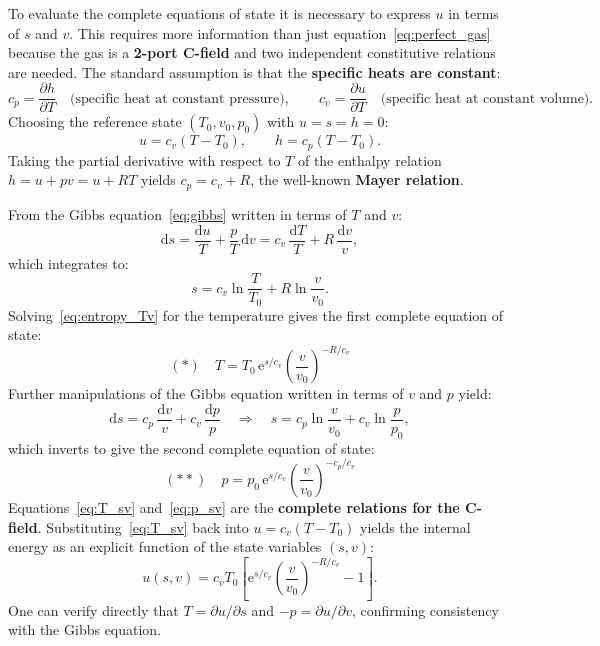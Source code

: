 To evaluate the complete equations of state it is necessary to express $u$
in terms of $s$ and $v$.  This requires more information than just
equation~\eqref{eq:perfect_gas} because the gas is a \textbf{2-port C-field}
and two independent constitutive relations are needed.  The standard
assumption is that the \textbf{specific heats are constant}:
\begin{equation}
  c_{p} = \frac{\partial h}{\partial T}
  \quad\text{(specific heat at constant pressure)},
  \qquad
  c_{v} = \frac{\partial u}{\partial T}
  \quad\text{(specific heat at constant volume)}.
  \label{eq:specific_heats}
\end{equation}
Choosing the reference state $(T_{0}, v_{0}, p_{0})$ with $u = s = h = 0$:
\begin{equation}
  u = c_{v}(T - T_{0}), \qquad h = c_{p}(T - T_{0}).
  \label{eq:u_h_linear}
\end{equation}
Taking the partial derivative with respect to $T$ of the enthalpy relation
$h = u + pv = u + RT$ yields $c_{p} = c_{v} + R$, the well-known
\textbf{Mayer relation}.

From the Gibbs equation~\eqref{eq:gibbs} written in terms of $T$ and $v$:
\begin{equation}
  \mathrm{d}s = \frac{\mathrm{d}u}{T} + \frac{p}{T}\,\mathrm{d}v
  = c_{v}\,\frac{\mathrm{d}T}{T} + R\,\frac{\mathrm{d}v}{v},
\end{equation}
which integrates to:
\begin{equation}
  s = c_{v}\ln\frac{T}{T_{0}} + R\ln\frac{v}{v_{0}}.
  \label{eq:entropy_Tv}
\end{equation}
Solving~\eqref{eq:entropy_Tv} for the temperature gives the first complete
equation of state:
\begin{equation}
  \boxed{
    (\ast)\quad
    T = T_{0}\,\mathrm{e}^{s/c_{v}}\!\left(\frac{v}{v_{0}}\right)^{-R/c_{v}}
  }
  \label{eq:T_sv}
\end{equation}
Further manipulations of the Gibbs equation written in terms of $v$ and $p$
yield:
\begin{equation}
  \mathrm{d}s = c_{p}\,\frac{\mathrm{d}v}{v} + c_{v}\,\frac{\mathrm{d}p}{p}
  \quad\Longrightarrow\quad
  s = c_{p}\ln\frac{v}{v_{0}} + c_{v}\ln\frac{p}{p_{0}},
\end{equation}
which inverts to give the second complete equation of state:
\begin{equation}
  \boxed{
    (\ast\ast)\quad
    p = p_{0}\,\mathrm{e}^{s/c_{v}}\!\left(\frac{v}{v_{0}}\right)^{-c_{p}/c_{v}}
  }
  \label{eq:p_sv}
\end{equation}
Equations~\eqref{eq:T_sv} and~\eqref{eq:p_sv} are the \textbf{complete
relations for the C-field}.  Substituting~\eqref{eq:T_sv} back into
$u = c_{v}(T - T_{0})$ yields the internal energy as an explicit function
of the state variables $(s,v)$:
\begin{equation}
  u(s,v) = c_{v}T_{0}\!\left[
    \mathrm{e}^{s/c_{v}}\!\left(\frac{v}{v_{0}}\right)^{-R/c_{v}} - 1
  \right].
  \label{eq:u_sv}
\end{equation}
One can verify directly that $T = \partial u/\partial s$ and
$-p = \partial u/\partial v$, confirming consistency with the Gibbs
equation.

